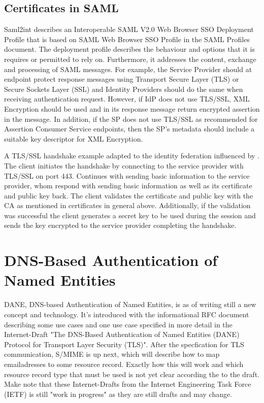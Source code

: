 \subsection{Certificates in SAML}

Saml2int\cite{website:saml2int} describes an Interoperable SAML V2.0 Web Browser SSO Deployment Profile that is based on 
SAML Web Browser SSO Profile in the SAML Profiles document\cite{pdf:oasis-open-profiles}. 
The deployment profile describes the behaviour and options that it is requires or permitted to rely on. 
Furthermore, it addresses the content, exchange and processing of SAML messages.
For example\cite{website:saml2int}, the Service Provider should at endpoint protect response 
messages using Transport Secure Layer (TLS) or Secure Sockets Layer (SSL)  and Identity Providers should do the same when receiving 
authentication request. 
However, if IdP does not use TLS/SSL, XML Encryption should be used and in its response 
message return encrypted assertion in the message. 
In addition, if the SP does not use TLS/SSL as recommended for Assertion Consumer Service
endpoints, then the SP's metadata should include a suitable key descriptor for XML Encryption.

A TLS/SSL handshake example adapted to the identity federation influenced by \cite{website:ssl_explained}.
The client initiates the handshake by connecting to the service provider with TLS/SSL on port 443. 
Continues with sending basic information to the service provider, whom respond with sending basic 
information as well as its certificate and public key back. 
The client validates the certificate and public key with the CA as mentioned in certificates in general above. 
Additionally, if the validation was successful the client generates a secret key to be used during the session and 
sends the key encrypted to the service provider completing the handshake. 

\section{DNS-Based Authentication of Named Entities} 
DANE, DNS-based Authentication of Named Entities, is as of writing still a new concept and technology.
It's introduced with the informational RFC document\cite{rfc:6394} describing some use cases and one use case specified in more detail in the Internet-Draft "The DNS-Based Authentication of Named Entities (DANE) Protocol for Transport Layer Security (TLS)"\cite{rfc:draft-dane}.
After the specfication for TLS communication, S/MIME is up next, which will describe how to map emailadresses to some resource record.
Exactly how this will work and which resource record type that must be used is not yet clear according the to the draft\cite{rfc:draft-smime}.
Make note that these Internet-Drafts from the Internet Engineering Task Force (IETF) is still "work in progress" as they are still drafts and may change.

